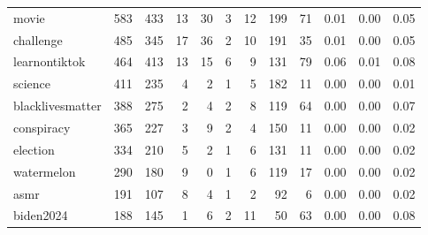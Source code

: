 \begin{tabular}{lrrrrrrrrrrr}
           movie &    583 &    433 &                          13 &                           30 &    3 &     12 &           199 &                         71 &   0.01 &         0.00 &                                0.05 \\
       challenge &    485 &    345 &                          17 &                           36 &    2 &     10 &           191 &                         35 &   0.01 &         0.00 &                                0.05 \\
   learnontiktok &    464 &    413 &                          13 &                           15 &    6 &      9 &           131 &                         79 &   0.06 &         0.01 &                                0.08 \\
         science &    411 &    235 &                           4 &                            2 &    1 &      5 &           182 &                         11 &   0.00 &         0.00 &                                0.01 \\
blacklivesmatter &    388 &    275 &                           2 &                            4 &    2 &      8 &           119 &                         64 &   0.00 &         0.00 &                                0.07 \\
      conspiracy &    365 &    227 &                           3 &                            9 &    2 &      4 &           150 &                         11 &   0.00 &         0.00 &                                0.02 \\
        election &    334 &    210 &                           5 &                            2 &    1 &      6 &           131 &                         11 &   0.00 &         0.00 &                                0.02 \\
      watermelon &    290 &    180 &                           9 &                            0 &    1 &      6 &           119 &                         17 &   0.00 &         0.00 &                                0.02 \\
            asmr &    191 &    107 &                           8 &                            4 &    1 &      2 &            92 &                          6 &   0.00 &         0.00 &                                0.02 \\
       biden2024 &    188 &    145 &                           1 &                            6 &    2 &     11 &            50 &                         63 &   0.00 &         0.00 &                                0.08 \\

\end{tabular}

